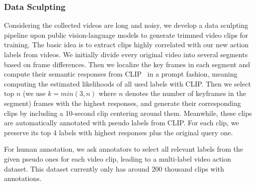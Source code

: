 
\subsubsection{Data Sculpting}





Considering the collected videos are long and noisy, we develop a data sculpting pipeline upon public vision-language models to generate trimmed video clips for training. The basic idea is to extract clips highly correlated with our new action labels from videos.
We initially divide every original video into several segments based on frame differences. Then we localize the key frames in each segment and compute their semantic responses from CLIP~\cite{clip} in a prompt fashion, meaning computing the estimated likelihoods of all used labels with CLIP. Then we select top $n$ (we use $k=min(3,n)$ where $n$ denotes the number of keyframes in the segment) frames with the highest responses, and generate their corresponding clips by including a 10-second clip centering around them. Meanwhile, these clips are automatically annotated with pseudo labels from CLIP. For each clip, we preserve its top 4 labels with highest responses plus the original query one. 


For human annotation, we ask annotators to select all relevant labels from the given pseudo ones for each video clip, leading to a multi-label video action dataset. This dataset currently only has around 200 thousand clips with annotations.
